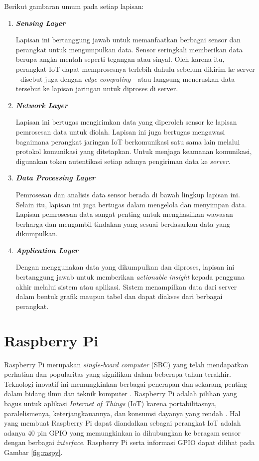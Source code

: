 Berikut gambaran umum pada setiap lapisan:
\begin{enumerate}
    \item \textbf{\textit{Sensing Layer}}

    Lapisan ini bertanggung jawab untuk memanfaatkan berbagai sensor dan perangkat untuk mengumpulkan data. Sensor seringkali memberikan data berupa angka mentah seperti tegangan atau sinyal. Oleh karena itu, perangkat IoT dapat memprosesnya terlebih dahulu sebelum dikirim ke server - disebut juga dengan \textit{edge-computing} - atau langsung meneruskan data tersebut ke lapisan jaringan untuk diproses di server.


    \item \textbf{\textit{Network Layer}}

    Lapisan ini bertugas mengirimkan data yang diperoleh sensor ke lapisan pemrosesan data untuk diolah. Lapisan ini juga bertugas mengawasi bagaimana perangkat jaringan IoT berkomunikasi satu sama lain melalui protokol komunikasi yang ditetapkan. Untuk menjaga keamanan komunikasi, digunakan token autentikasi setiap adanya pengiriman data ke \textit{server}.

    \item \textbf{\textit{Data Processing Layer}}

    Pemrosesan dan analisis data sensor berada di bawah lingkup lapisan ini. Selain itu, lapisan ini juga bertugas dalam mengelola dan menyimpan data. Lapisan pemrosesan data sangat penting untuk menghasilkan wawasan berharga dan mengambil tindakan yang sesuai berdasarkan data yang dikumpulkan.

    \item \textbf{\textit{Application Layer}}

    Dengan menggunakan data yang dikumpulkan dan diproses, lapisan ini bertanggung jawab untuk memberikan \textit{actionable insight} kepada pengguna akhir melalui sistem atau aplikasi. Sistem menampilkan data dari server dalam bentuk grafik maupun tabel dan dapat diakses dari berbagai perangkat.


\end{enumerate}

\section{Raspberry Pi}
Raspberry Pi merupakan \textit{single-board computer} (SBC) yang telah mendapatkan perhatian dan popularitas yang signifikan dalam beberapa tahun terakhir. Teknologi inovatif ini memungkinkan berbagai penerapan dan sekarang penting dalam bidang ilmu dan teknik komputer \parencite{article:johnston}. Raspberry Pi adalah pilihan yang bagus untuk aplikasi \textit{Internet of Things} (IoT) karena portabilitasnya, paralelismenya, keterjangkauannya, dan konsumsi dayanya yang rendah \parencite{article:hosny}. Hal yang membuat Raspberry Pi dapat diandalkan sebagai perangkat IoT adalah adanya 40 pin GPIO yang memungkinkan ia dihubungkan ke beragam sensor dengan berbagai \textit{interface}. Raspberry Pi serta informasi GPIO dapat dilihat pada Gambar \ref{fig:raspy}.

